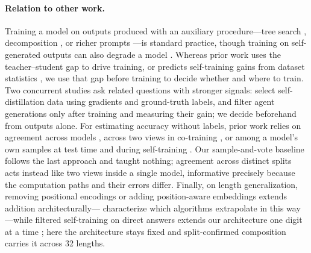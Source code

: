 \paragraph{Relation to other work.}
\label{sec:related}
Training a model on outputs produced with an auxiliary procedure---tree search
\citep{anthony2017thinking}, decomposition \citep{christiano2018amplification},
or richer prompts \citep{zhang2026basersi}---is standard practice, though
training on self-generated outputs can also degrade a model
\citep{shumailov2024collapse}. Whereas prior work uses the teacher--student gap
to drive training, or predicts self-training gains from dataset statistics
\citep{vanasch2016predicting}, we use that gap before training to decide
whether and where to train. Two concurrent studies ask related questions with
stronger signals: \citet{li2026evolve} select self-distillation data using
gradients and ground-truth labels, and \citet{he2026recursive} filter agent
generations only after training and measuring their gain; we decide beforehand
from outputs alone. For estimating accuracy without labels, prior work relies
on agreement across models \citep{baek2022agreement}, across two views in
co-training \citep{blum1998cotraining}, or among a model's own samples at test
time \citep{wang2023selfconsistency} and during self-training
\citep{shafayat2025selftrain}. Our sample-and-vote baseline follows the last
approach and taught nothing; agreement across distinct splits acts instead like
two views inside a single model, informative precisely because the computation
paths and their errors differ. Finally, on length generalization, removing
positional encodings \citep{kazemnejad2023positional} or adding position-aware
embeddings \citep{mcleish2024abacus} extends addition
architecturally---\citet{zhou2024algorithms} characterize which algorithms
extrapolate in this way---while filtered self-training on direct answers
extends our architecture one digit at a time \citep{lee2025selfimproving}; here
the architecture stays fixed and split-confirmed composition carries it across
32 lengths.

